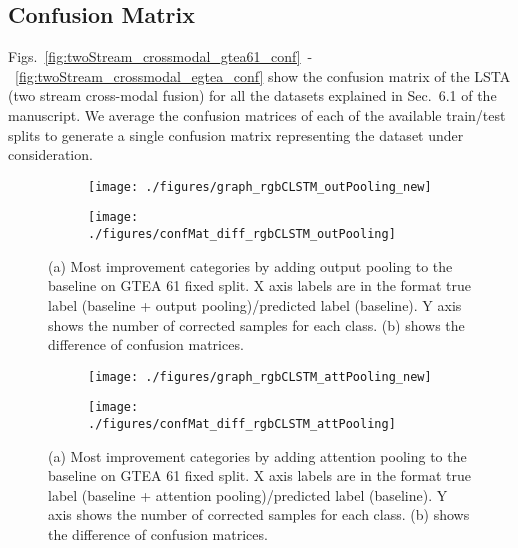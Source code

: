 \documentclass[10pt,twocolumn,letterpaper]{article}
\begin{document}
\begin{matrix*}[r]
	
	
	\section{Confusion Matrix}
	
	Figs.~\ref{fig:twoStream_crossmodal_gtea61_conf}~-~\ref{fig:twoStream_crossmodal_egtea_conf} show the confusion matrix of the LSTA (two stream cross-modal fusion) for all the datasets explained in Sec.~6.1 of the manuscript. We average the confusion matrices of each of the available train/test splits to generate a single confusion matrix representing the dataset under consideration.

	

	
	
	
		\begin{figure*}[t]
		\centering
		\begin{subfigure}[b]{0.45\textwidth}
			\texttt{[image: ./figures/graph\_rgbCLSTM\_outPooling\_new]}
			\caption{}
			\label{fig:base+outPoolingImp}
		\end{subfigure} \hspace{4mm}
		\begin{subfigure}[b]{0.45\textwidth}
			\texttt{[image: ./figures/confMat\_diff\_rgbCLSTM\_outPooling]}
			\label{fig:base+outPoolingConf}
			\caption{}
		\end{subfigure}
		\caption{(a) Most improvement categories by adding output pooling to the baseline on GTEA 61 fixed split. X axis labels are in the format true label (baseline + output pooling)/predicted label (baseline). Y axis shows the number of corrected samples for each class. (b) shows the difference of confusion matrices.}
		\label{fig:base+outPooling}
	\end{figure*}
	
	\begin{figure*}[t]
		\centering
		\begin{subfigure}[b]{0.45\textwidth}
			\texttt{[image: ./figures/graph\_rgbCLSTM\_attPooling\_new]}
			\label{fig:base+attPoolingImp}
			\caption{}
		\end{subfigure} \hspace{4mm}
		\begin{subfigure}[b]{0.45\textwidth}
			\texttt{[image: ./figures/confMat\_diff\_rgbCLSTM\_attPooling]}
			\label{fig:base+attPoolingConf}
			\caption{}
		\end{subfigure}
		\caption{(a) Most improvement categories by adding attention pooling to the baseline on GTEA 61 fixed split. X axis labels are in the format true label (baseline + attention pooling)/predicted label (baseline). Y axis shows the number of corrected samples for each class. (b) shows the difference of confusion matrices.}
		\label{fig:base+attPooling}
	\end{figure*}
	

\end{matrix*}
\end{document}
